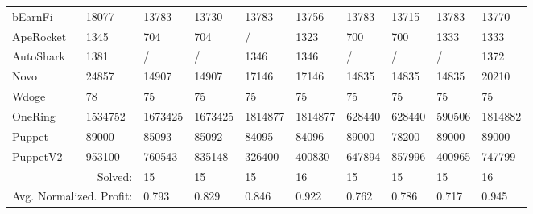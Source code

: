 \begin{table}[thbp]
\begin{tabular}{|l|l|llllllll|}
bEarnFi               & 18077                   & 13783   & 13730   & 13783   & 13756   & 13783   & 13715   & 13783   & 13770    \\
ApeRocket             & 1345                    & 704     & 704     & /       & 1323    & 700     & 700     & 1333    & 1333     \\
AutoShark             & 1381                    & /       & /       & 1346    & 1346    & /       & /       & /       & 1372     \\
Novo                  & 24857                   & 14907   & 14907   & 17146   & 17146   & 14835   & 14835   & 14835   & 20210    \\
Wdoge                 & 78                      & 75      & 75      & 75      & 75      & 75      & 75      & 75      & 75       \\
OneRing               & 1534752                 & 1673425 & 1673425 & 1814877 & 1814877 & 628440  & 628440  & 590506  & 1814882  \\
Puppet                & 89000                   & 85093   & 85092   & 84095   & 84096   & 89000   & 78200   & 89000   & 89000    \\
PuppetV2              & 953100                  & 760543  & 835148  & 326400  & 400830  & 647894  & 857996  & 400965  & 747799   \\ \hline
\multicolumn{2}{|r|}{Solved:}                   & 15      & 15      & 15      & 16      & 15      & 15      & 15      & 16       \\ 
\multicolumn{2}{|r|}{Avg. Normalized. Profit:}  & 0.793   & 0.829   & 0.846   & 0.922   & 0.762   & 0.786   & 0.717   & 0.945    \\ \hline 
\end{tabular}




\end{table}
